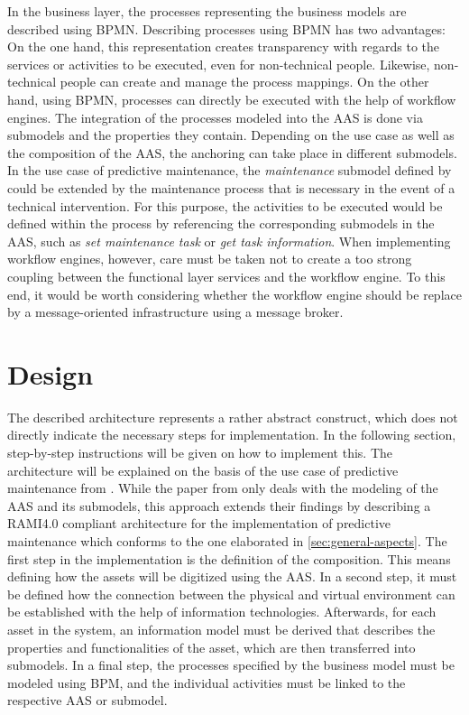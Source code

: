 In the business layer, the processes representing the business models are described using \ac{BPMN}. Describing processes using \ac{BPMN} has two advantages: On the one hand, this representation creates transparency with regards to the services or activities to be executed, even for non-technical people. Likewise, non-technical people can create and manage the process mappings. On the other hand, using \ac{BPMN}, processes can directly be executed with the help of workflow engines. The integration of the processes modeled into the \ac{AAS} is done via submodels and the properties they contain. Depending on the use case as well as the composition of the \ac{AAS}, the anchoring can take place in different submodels. In the use case of predictive maintenance, the \textit{maintenance} submodel defined by \citeauthor{Cavalieri2020AShell} could be extended by the maintenance process that is necessary in the event of a technical intervention. For this purpose, the activities to be executed would be defined within the process by referencing the corresponding submodels in the \ac{AAS}, such as \textit{set maintenance task} or \textit{get task information}. When implementing workflow engines, however, care must be taken not to create a too strong coupling between the functional layer services and the workflow engine. To this end, it would be worth considering whether the workflow engine should be replace by a message-oriented infrastructure using a message broker.

\section{Design}

The described architecture represents a rather abstract construct, which does not directly indicate the necessary steps for implementation. In the following section, step-by-step instructions will be given on how to implement this. The architecture will be explained on the basis of the use case of predictive maintenance from \citeauthor{Cavalieri2020AShell}. While the paper from \citeauthor{Cavalieri2020AShell} only deals with the modeling of the \ac{AAS} and its submodels, this approach extends their findings by describing a \ac{RAMI4.0} compliant architecture for the implementation of predictive maintenance which conforms to the one elaborated in \ref{sec:general-aspects}. The first step in the implementation is the definition of the composition. This means defining how the assets will be digitized using the \ac{AAS}. In a second step, it must be defined how the connection between the physical and virtual environment can be established with the help of information technologies. Afterwards, for each asset in the system, an information model must be derived that describes the properties and functionalities of the asset, which are then transferred into submodels. In a final step, the processes specified by the business model must be modeled using \ac{BPM}, and the individual activities must be linked to the respective \ac{AAS} or submodel.

